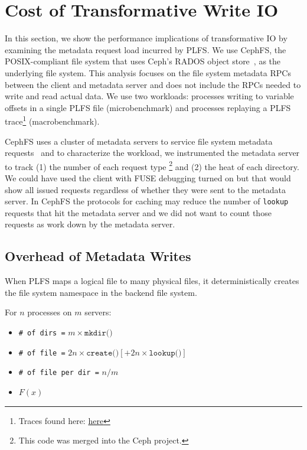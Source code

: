 \section{Cost of Transformative Write IO}

In this section, we show the performance implications of transformative IO by
examining the metadata request load incurred by PLFS. We use CephFS, the
POSIX-compliant file system that uses Ceph's RADOS object
store~\cite{weil:osdi2006-ceph}, as the underlying file system.  This analysis
focuses on the file system metadata RPCs between the client and metadata server
and does not include the RPCs needed to write and read actual data.  We use two
workloads: processes writing to variable offsets in a single PLFS file
(microbenchmark) and processes replaying a PLFS trace\footnote{Traces found
here:
\href{https://web.archive.org/web/20140419194914/http://institutes.lanl.gov/plfs/maps/}{here}}
(macrobenchmark). 

CephFS uses a cluster of metadata servers to service file system metadata
requests~\cite{weil:sc2004-dyn-metadata} and to characterize the workload, we
instrumented the metadata server to track (1) the number of each request type
\footnote{This code was merged into the Ceph project.} and (2) the heat of each
directory.  We could have used the client with FUSE debugging turned on but
that would show all issued requests regardless of whether they were sent to the
metadata server. In CephFS the protocols for caching may reduce the number of
\texttt{lookup} requests that hit the metadata server and we did not want to
count those requests as work down by the metadata server.


\subsection{Overhead of Metadata Writes}
When PLFS maps a logical file to many physical files, it deterministically
creates the file system namespace in the backend file system.  

For \(n\) processes on \(m\) servers:

\begin{itemize}
  \item[] \texttt{\# of dirs =} \(m \times \texttt{mkdir()}\)
  \item[] \texttt{\# of file =} \(2n \times \texttt{create()} [+ 2n \times \texttt{lookup()}]\)
  \item[] \texttt{\# of file per dir =} \(n/m\)
  \item[] \(F(x)\)
\end{itemize}

